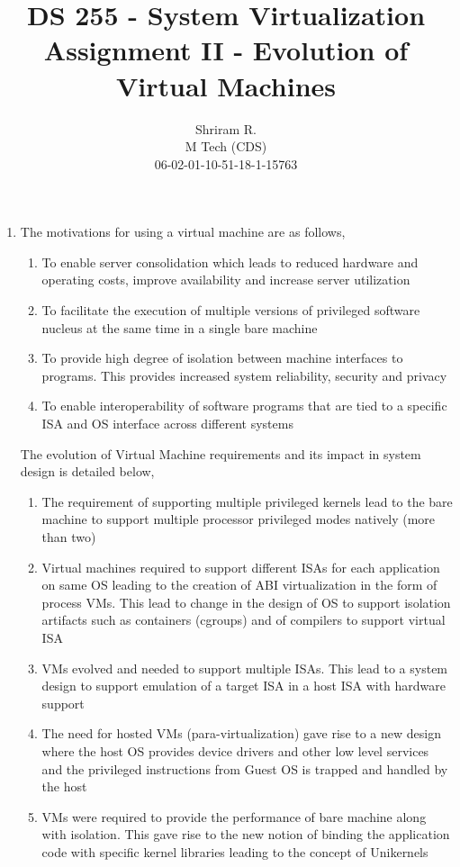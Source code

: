 \documentclass[11pt,a4paper,oneside]{article}
\begin{document}
	\title{DS 255 - System Virtualization \\ Assignment II - Evolution of Virtual Machines}
	\author{Shriram R. \\ M Tech (CDS) \\ 06-02-01-10-51-18-1-15763}
	\maketitle	
	
	\begin{enumerate}
		\item The motivations for using a virtual machine are as follows,
			  \begin{enumerate}
			  	\item To enable server consolidation which leads to reduced hardware and operating costs, improve availability and increase server utilization 
			  	\item To facilitate the execution of multiple versions of privileged software nucleus at the same time in a single bare machine
			  	\item To provide high degree of isolation between machine interfaces to programs. This provides increased system reliability, security and privacy
			  	\item To enable interoperability of software programs that are tied to a specific ISA and OS interface across different systems
			  \end{enumerate}
		      The evolution of Virtual Machine requirements and its impact in system design is detailed below,
		      \begin{enumerate}
		      	\item The requirement of supporting multiple privileged kernels lead to the bare machine to support multiple processor privileged modes natively (more than two) 
		      	\item Virtual machines required to support different ISAs for each application on same OS leading to the creation of ABI virtualization in the form of process VMs. This lead to change in the design of OS to support isolation artifacts such as containers (cgroups) and of compilers to support virtual ISA
		      	\item VMs evolved and needed to support multiple ISAs. This lead to a system design to support emulation of a target ISA in a host ISA with hardware support  
		      	\item The need for hosted VMs (para-virtualization) gave rise to a new design where the host OS provides device drivers and other low level services and the privileged instructions from Guest OS is trapped and handled by the host
		      	\item VMs were required to provide the performance of bare machine along with isolation. This gave rise to the new notion of binding the application code with specific kernel libraries leading to the concept of Unikernels
		      \end{enumerate}	
		      

\end{enumerate}
\end{document}
